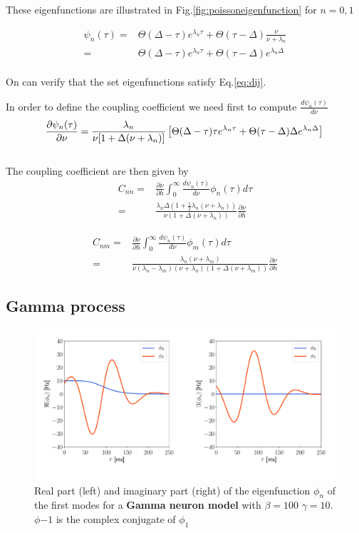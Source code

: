 \documentclass[12pt,twoside]{report}
\begin{document}
These eigenfunctions are illustrated in Fig.\ref{fig:poissoneigenfunction} for $n=0,1$

\begin{align}
\psi_n(\tau)=&\Theta(\Delta-\tau)e^{\lambda_n\tau} +  \Theta(\tau-\Delta) \frac{\nu}{\nu+\lambda_n}\nonumber\\
=&\Theta(\Delta-\tau)e^{\lambda_n\tau} +  \Theta(\tau-\Delta)e^{\lambda_n\Delta}
\end{align}\\

On can verify that the set eigenfunctions satisfy Eq.\eqref{eq:dij}.

In order to define the coupling coefficient we need first to compute $\frac{d\psi_n(\tau)}{d\nu}$ 
\begin{equation}
\frac{\partial\psi_n(\tau)}{\partial\nu}=\frac{\lambda_n}{\nu[1+\Delta(\nu+\lambda_n)]}\left[\Theta(\Delta-\tau)\tau e^{\lambda_n\tau} +  \Theta(\tau-\Delta)\Delta e^{\lambda_n\Delta}\right]\\
\end{equation}\\

The coupling coefficient are then given by
\begin{align}
C_{nn}=&\frac{\partial \nu}{\partial h}\int_0^\infty\frac{d\psi_n(\tau)}{d\nu}\phi_n(\tau)d\tau \nonumber\\
=&\frac{\lambda_n\Delta(1+\frac{1}{2}\lambda_n(\nu+\lambda_n))}{\nu(1+\Delta(\nu+\lambda_n))}\frac{\partial \nu}{\partial h}
\end{align}


\begin{align}
C_{nm}=&\frac{\partial \nu}{\partial h}\int_0^\infty\frac{d\psi_n(\tau)}{d\nu}\phi_m(\tau)d\tau \nonumber\\
=&\frac{\lambda_n(\nu+\lambda_m)}{\nu(\lambda_n-\lambda_m)(\nu+\lambda_n)(1+\Delta(\nu+\lambda_m))}\frac{\partial \nu}{\partial h}
\end{align}




\subsection{Gamma process}

\begin{figure}[h!]
	\centering
	\includegraphics[width=0.8\linewidth]{gamma_eigenfunction.pdf}
	\caption{Real part (left) and imaginary part (right) of the eigenfunction $\phi_n$ of the first modes for a \textbf{Gamma neuron model} with $\beta=100$
		$\gamma=10$. $\phi{-1}$ is the complex conjugate of  $\phi_{1}$}
	\label{fig:gammaeigenfunction}
\end{figure}
\end{document}
